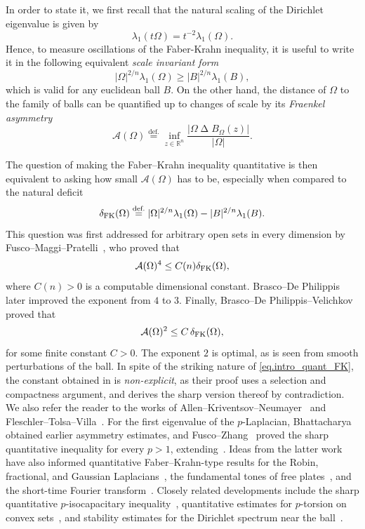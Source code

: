 \documentclass[11pt]{amsart}
\theoremstyle{plain}
\theoremstyle{definition}
\newcommand{\eqdef}{\overset{\text{def.}}{=}}
\begin{document}
In order to state it, we first recall that the natural scaling of the Dirichlet eigenvalue is given by 
\[
    \lambda_1(t \Omega) = t^{-2}\lambda_1(\Omega).
\]
Hence, to measure oscillations of the Faber-Krahn inequality, it is useful to write it in the following equivalent \textit{scale invariant form} 
\[
    |\Omega|^{2/n} \lambda_1(\Omega)
    \ge 
    |B|^{2/n} \lambda_1(B),
\]
which is valid for any euclidean ball $B$. On the other hand, the distance of $\Omega$ to the family of balls can be quantified up to changes of scale by its \emph{Fraenkel asymmetry}
\[
  \mathcal A(\Omega)
  \eqdef
  \inf_{z\in\mathbb R^n}
  \frac{|\Omega\mathbin\Delta B_\Omega(z)|}{|\Omega|}.
\]

The question of making the Faber--Krahn inequality quantitative is then equivalent to asking how small $\mathcal{A}(\Omega)$ has to be, especially when compared to the natural deficit
\begin{equation*}
  \delta_{\rm FK} (\Omega) \eqdef 
  |\Omega|^{2/n} \lambda_1(\Omega) - |B|^{2/n} \lambda_1(B).
\end{equation*}
This question was first addressed for arbitrary open sets in every dimension by Fusco--Maggi--Pratelli~\cite{FuscoMaggiPratelli2009Eigenvalue}, who proved that
\[
\mathcal{A}(\Omega)^4 \leq C(n) \delta_{\rm FK}(\Omega),
\]
where $C(n) > 0$ is a computable dimensional constant. Brasco--De Philippis~\cite[Theorem~2.10]{brasco2017spectral} later improved the exponent from $4$ to $3$. Finally, Brasco--De Philippis--Velichkov~\cite{brasco2015faber} proved that
\begin{equation}\label{eq.intro_quant_FK}
\mathcal{A}(\Omega)^2 \le C \, \delta_{\rm FK}(\Omega),
\end{equation}
for some finite constant $C>0$. The exponent $2$ is optimal, as is seen from smooth perturbations of the ball. In spite of the striking nature of \eqref{eq.intro_quant_FK}, the constant obtained in \cite{brasco2015faber} is \emph{non-explicit}, as their proof uses a selection and compactness argument, and derives the sharp version thereof by contradiction. We also refer the reader to the works of Allen--Kriventsov--Neumayer~\cite{Allen2021,AllenKriventsovNeumayer2023,AllenKriventsovNeumayer2025} and Fleschler--Tolsa--Villa~\cite{FleschlerTolsaVilla2024}. For the first eigenvalue of the $p$-Laplacian, Bhattacharya~\cite{Bhattacharya2001} obtained earlier asymmetry estimates, and Fusco--Zhang~\cite{FuscoZhang2017} proved the sharp quantitative inequality for every $p>1$, extending~\cite{brasco2015faber}. Ideas from the latter work have also informed quantitative Faber--Krahn-type results for the Robin, fractional, and Gaussian Laplacians~\cite{BucurFeroneNitschTrombetti2018,BrascoCintiVita2020,CarbottiCitoLaMannaPallara2024}, the fundamental tones of free plates~\cite{BuosoChasmanProvenzano2018}, and the short-time Fourier transform~\cite{GomezGuerraRamosTilli2024}. Closely related developments include the sharp quantitative $p$-isocapacitary inequality~\cite{Mukoseeva2023}, quantitative estimates for $p$-torsion on convex sets~\cite{AmatoMasielloPaoliSannipoli2023}, and stability estimates for the Dirichlet spectrum near the ball~\cite{BucurLamboleyNahonPrunier2026}.
\end{document}
